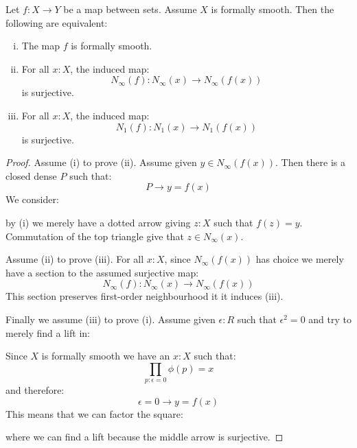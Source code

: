 \begin{proposition}\label{smooth-sets-map}
Let $f:X\to Y$ be a map between sets. Assume $X$ is formally smooth. Then the following are equivalent:
\begin{enumerate}[(i)]
\item The map $f$ is formally smooth. 
\item For all $x:X$, the induced map:
\[N_\infty(f) : N_\infty(x)\to N_\infty(f(x))\]
is surjective.
\item For all $x:X$, the induced map:
\[N_1(f) : N_1(x)\to N_1(f(x))\]
is surjective.
\end{enumerate}
\end{proposition}

\begin{proof}
Assume (i) to prove (ii). Assume given $y\in N_\infty(f(x))$. Then there is a closed dense $P$ such that:
\[P \to y=f(x)\]
We consider:
 \begin{center}
    \end{center}
by (i) we merely have a dotted arrow giving $z:X$ such that $f(z)=y$. Commutation of the top triangle give that $z\in N_\infty(x)$.

Assume (ii) to prove (iii). For all $x:X$, since $N_\infty(f(x))$ has choice we merely have a section to the assumed surjective map: 
\[N_\infty(f) : N_\infty(x)\to N_\infty(f(x))\]
This section preserves first-order neighbourhood it it induces (iii).

Finally we assume (iii) to prove (i). Assume given $\epsilon:R$ such that $\epsilon^2=0$ and try to merely find a lift in:
 \begin{center}
    \end{center}
    Since $X$ is formally smooth we have an $x:X$ such that:
\[\prod_{p:\epsilon=0} \phi(p)=x\]
and therefore:
\[ \epsilon=0 \to y=f(x)\]
This means that we can factor the square:
 \begin{center}
    \end{center}
    where we can find a lift because the middle arrow is surjective.
\end{proof}

